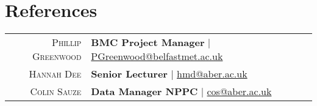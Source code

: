 \documentclass[a4paper,10pt]{article}
\begin{document}
\section{References}
\begin{tabular}{rl}	
  \textsc{Phillip Greenwood} & \textbf{BMC Project Manager} | \href{PGreenwood@belfastmet.ac.uk}{PGreenwood@belfastmet.ac.uk}
  \\
  \textsc{Hannah Dee} & \textbf{Senior Lecturer} | \href{hmd@aber.ac.uk}{hmd@aber.ac.uk}
  \\
  \textsc{Colin Sauze} & \textbf{Data Manager NPPC} | \href{cos@aber.ac.uk}{cos@aber.ac.uk}

\end{tabular}



\end{document}
